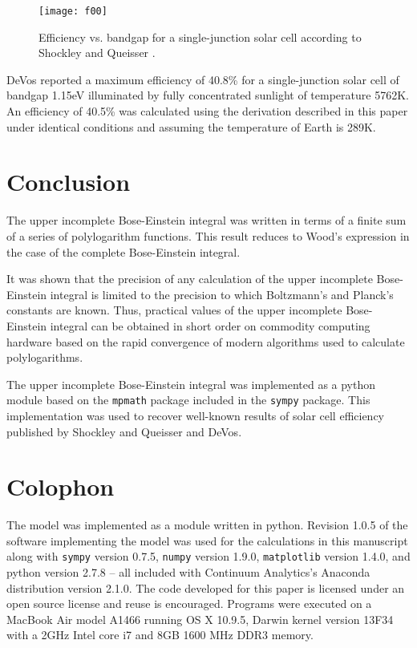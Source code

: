 \documentclass[aip,jap,reprint]{revtex4-1}
\begin{document}
\begin{figure}
\texttt{[image: f00]}
\caption{Efficiency vs. bandgap for a single-junction solar cell according to Shockley and Queisser \cite{10.1063/1.1736034}.}
\label{fig:00}
\end{figure}


DeVos \cite{9780198513926} reported a maximum efficiency of 40.8\% for a single-junction solar cell of bandgap 1.15eV illuminated by fully concentrated sunlight of temperature 5762K. An efficiency of 40.5\% was calculated using the derivation described in this paper under identical conditions and assuming the temperature of Earth is 289K.


\section{Conclusion}
The upper incomplete Bose-Einstein integral was written in terms of a finite sum of a series of polylogarithm functions. This result reduces to Wood's expression in the case of the complete Bose-Einstein integral. 

It was shown that the precision of any calculation of the upper incomplete Bose-Einstein integral is limited to the precision to which Boltzmann's and Planck's constants are known. Thus, practical values of the upper incomplete Bose-Einstein integral can be obtained in short order on commodity computing hardware based on the rapid convergence of modern algorithms used to calculate polylogarithms.

The upper incomplete Bose-Einstein integral was implemented as a python module based on the \texttt{mpmath} package included in the \texttt{sympy} package. This implementation was used to recover well-known results of solar cell efficiency published by Shockley and Queisser and DeVos.


\section{Colophon}
The model was implemented as a module written in python. Revision 1.0.5 \cite{10.6084/m9.figshare.1229713} of the software implementing the model was used for the calculations in this manuscript along with \texttt{sympy} version 0.7.5, \texttt{numpy} version 1.9.0, \texttt{matplotlib} version 1.4.0, and python version 2.7.8 -- all included with Continuum Analytics's Anaconda distribution version 2.1.0. The code developed for this paper is licensed under an open source license and reuse is encouraged. Programs were executed on a MacBook Air model A1466 running OS X 10.9.5, Darwin kernel version 13F34 with a 2GHz Intel core i7 and 8GB 1600 MHz DDR3 memory.
\end{document}
